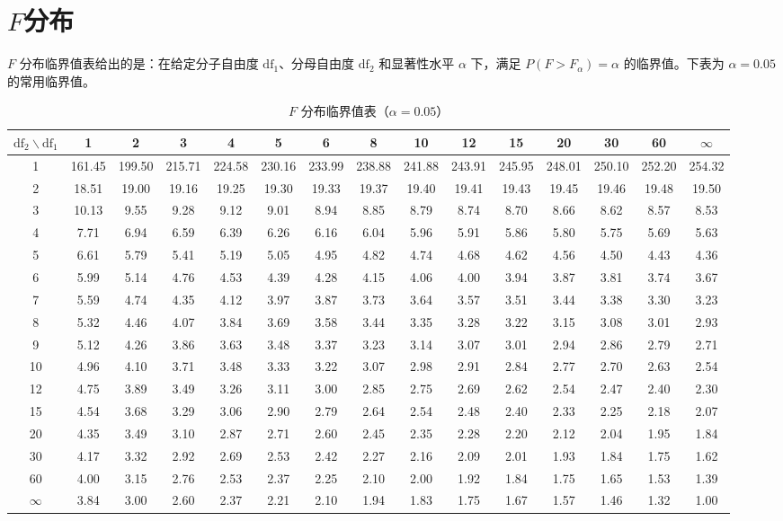 \documentclass[lang=cn,10pt]{elegantbook}
\begin{document}
\newpage
\section{$F$分布}
$F$ 分布临界值表给出的是：在给定分子自由度 $\mathrm{df}_1$、分母自由度 $\mathrm{df}_2$ 和显著性水平 $\alpha$ 下，满足 $P(F>F_{\alpha})=\alpha$ 的临界值。下表为 $\alpha=0.05$ 的常用临界值。

\begin{table}[H]
  \centering
  \caption{$F$ 分布临界值表（$\alpha=0.05$）}
  \small
  \begin{tabular}{c|cccccccccccccc}
    \toprule
    $\mathrm{df}_2\backslash\mathrm{df}_1$ & 1 & 2 & 3 & 4 & 5 & 6 & 8 & 10 & 12 & 15 & 20 & 30 & 60 & $\infty$ \\
    \midrule
    1 & 161.45 & 199.50 & 215.71 & 224.58 & 230.16 & 233.99 & 238.88 & 241.88 & 243.91 & 245.95 & 248.01 & 250.10 & 252.20 & 254.32 \\
    2 & 18.51 & 19.00 & 19.16 & 19.25 & 19.30 & 19.33 & 19.37 & 19.40 & 19.41 & 19.43 & 19.45 & 19.46 & 19.48 & 19.50 \\
    3 & 10.13 & 9.55 & 9.28 & 9.12 & 9.01 & 8.94 & 8.85 & 8.79 & 8.74 & 8.70 & 8.66 & 8.62 & 8.57 & 8.53 \\
    4 & 7.71 & 6.94 & 6.59 & 6.39 & 6.26 & 6.16 & 6.04 & 5.96 & 5.91 & 5.86 & 5.80 & 5.75 & 5.69 & 5.63 \\
    5 & 6.61 & 5.79 & 5.41 & 5.19 & 5.05 & 4.95 & 4.82 & 4.74 & 4.68 & 4.62 & 4.56 & 4.50 & 4.43 & 4.36 \\
    6 & 5.99 & 5.14 & 4.76 & 4.53 & 4.39 & 4.28 & 4.15 & 4.06 & 4.00 & 3.94 & 3.87 & 3.81 & 3.74 & 3.67 \\
    7 & 5.59 & 4.74 & 4.35 & 4.12 & 3.97 & 3.87 & 3.73 & 3.64 & 3.57 & 3.51 & 3.44 & 3.38 & 3.30 & 3.23 \\
    8 & 5.32 & 4.46 & 4.07 & 3.84 & 3.69 & 3.58 & 3.44 & 3.35 & 3.28 & 3.22 & 3.15 & 3.08 & 3.01 & 2.93 \\
    9 & 5.12 & 4.26 & 3.86 & 3.63 & 3.48 & 3.37 & 3.23 & 3.14 & 3.07 & 3.01 & 2.94 & 2.86 & 2.79 & 2.71 \\
    10 & 4.96 & 4.10 & 3.71 & 3.48 & 3.33 & 3.22 & 3.07 & 2.98 & 2.91 & 2.84 & 2.77 & 2.70 & 2.63 & 2.54 \\
    12 & 4.75 & 3.89 & 3.49 & 3.26 & 3.11 & 3.00 & 2.85 & 2.75 & 2.69 & 2.62 & 2.54 & 2.47 & 2.40 & 2.30 \\
    15 & 4.54 & 3.68 & 3.29 & 3.06 & 2.90 & 2.79 & 2.64 & 2.54 & 2.48 & 2.40 & 2.33 & 2.25 & 2.18 & 2.07 \\
    20 & 4.35 & 3.49 & 3.10 & 2.87 & 2.71 & 2.60 & 2.45 & 2.35 & 2.28 & 2.20 & 2.12 & 2.04 & 1.95 & 1.84 \\
    30 & 4.17 & 3.32 & 2.92 & 2.69 & 2.53 & 2.42 & 2.27 & 2.16 & 2.09 & 2.01 & 1.93 & 1.84 & 1.75 & 1.62 \\
    60 & 4.00 & 3.15 & 2.76 & 2.53 & 2.37 & 2.25 & 2.10 & 2.00 & 1.92 & 1.84 & 1.75 & 1.65 & 1.53 & 1.39 \\
    $\infty$ & 3.84 & 3.00 & 2.60 & 2.37 & 2.21 & 2.10 & 1.94 & 1.83 & 1.75 & 1.67 & 1.57 & 1.46 & 1.32 & 1.00 \\
    \bottomrule
  \end{tabular}
\end{table}
\end{document}
